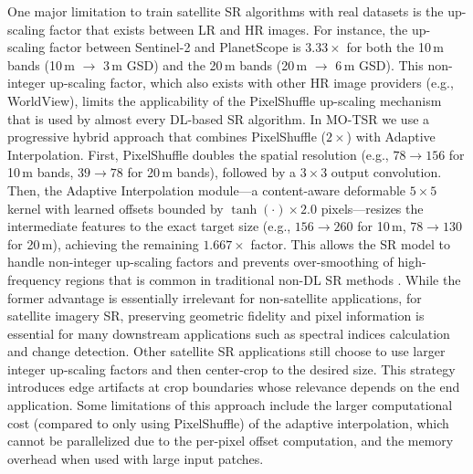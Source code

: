         One major limitation to train satellite SR algorithms with real datasets is the up-scaling factor that exists between LR and HR images. For instance, the up-scaling factor between Sentinel-2 and PlanetScope is $3.33\times$ for both the 10\,m bands (10\,m $\to$ 3\,m GSD) and the 20\,m bands (20\,m $\to$ 6\,m GSD). This non-integer up-scaling factor, which also exists with other HR image providers (e.g., WorldView), limits the applicability of the PixelShuffle up-scaling mechanism that is used by almost every DL-based SR algorithm. In MO-TSR we use a progressive hybrid approach that combines PixelShuffle ($2\times$) with Adaptive Interpolation. First, PixelShuffle doubles the spatial resolution (e.g., $78 \to 156$ for 10\,m bands, $39 \to 78$ for 20\,m bands), followed by a $3 \times 3$ output convolution. Then, the Adaptive Interpolation module---a content-aware deformable $5 \times 5$ kernel with learned offsets bounded by $\tanh(\cdot) \times 2.0$ pixels---resizes the intermediate features to the exact target size (e.g., $156 \to 260$ for 10\,m, $78 \to 130$ for 20\,m), achieving the remaining $1.667\times$ factor. This allows the SR model to handle non-integer up-scaling factors and prevents over-smoothing of high-frequency regions that is common in traditional non-DL SR methods \citep{Zhang2022223}. While the former advantage is essentially irrelevant for non-satellite applications, for satellite imagery SR, preserving geometric fidelity and pixel information is essential for many downstream applications such as spectral indices calculation and change detection. Other satellite SR applications still choose to use larger integer up-scaling factors and then center-crop to the desired size. This strategy introduces edge artifacts at crop boundaries whose relevance depends on the end application. Some limitations of this approach include the larger computational cost (compared to only using PixelShuffle) of the adaptive interpolation, which cannot be parallelized due to the per-pixel offset computation, and the memory overhead when used with large input patches.

